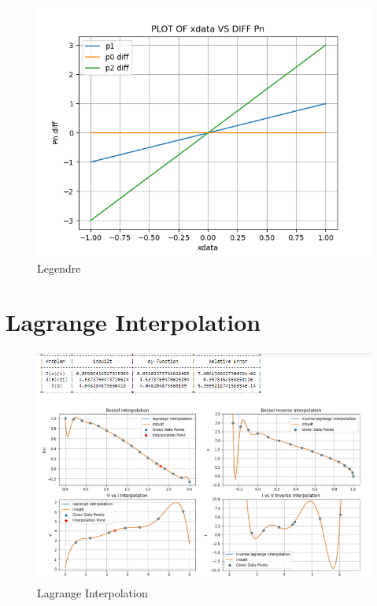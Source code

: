 \documentclass{article}
\begin{document}
\clearpage
\begin{figure}[h]
    \centering
    \includegraphics[width=12cm,height=10cm \textwidth]{Legendre/Figure_2.png}
\caption{Legendre}
\end{figure}

\newpage
\section{Lagrange Interpolation}


\newpage
\begin{figure}[h]
    \centering
    \includegraphics[width=15cm,height=12cm \textwidth]{Lagrange_Interpolation/Capture.PNG}
\caption{Lagrange Interpolation}
\end{figure}
\end{document}
